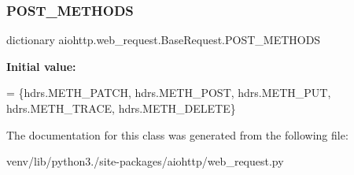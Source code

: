 \subsubsection{\texorpdfstring{P\+O\+S\+T\+\_\+\+M\+E\+T\+H\+O\+DS}{POST\_METHODS}}
{\footnotesize\ttfamily dictionary aiohttp.\+web\+\_\+request.\+Base\+Request.\+P\+O\+S\+T\+\_\+\+M\+E\+T\+H\+O\+DS\hspace{0.3cm}{\ttfamily [static]}}

{\bfseries Initial value\+:}
\begin{DoxyCode}
=  \{hdrs.METH\_PATCH, hdrs.METH\_POST, hdrs.METH\_PUT,
                    hdrs.METH\_TRACE, hdrs.METH\_DELETE\}
\end{DoxyCode}


The documentation for this class was generated from the following file\+:\begin{DoxyCompactItemize}
\item 
venv/lib/python3./site-\/packages/aiohttp/web\+\_\+request.\+py\end{DoxyCompactItemize}
